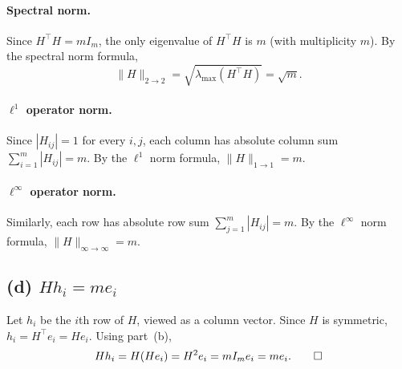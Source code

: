 \paragraph{Spectral norm.}
Since $H^\top H=mI_m$, the only eigenvalue of $H^\top H$ is $m$ (with multiplicity $m$). By the spectral norm formula,
\[
\|H\|_{2\to 2} = \sqrt{\lambda_{\max}(H^\top H)} = \sqrt{m}.
\]

\paragraph{$\ell^1$ operator norm.}
Since $|H_{ij}|=1$ for every $i,j$, each column has absolute column sum $\sum_{i=1}^m |H_{ij}| = m$. By the $\ell^1$ norm formula, $\|H\|_{1\to 1}=m$.

\paragraph{$\ell^\infty$ operator norm.}
Similarly, each row has absolute row sum $\sum_{j=1}^m |H_{ij}| = m$. By the $\ell^\infty$ norm formula, $\|H\|_{\infty\to \infty}=m$.

\subsection*{(d) $Hh_i=me_i$}

Let $h_i$ be the $i$th row of $H$, viewed as a column vector. Since $H$ is symmetric, $h_i = H^\top e_i = He_i$. Using part~(b),
\[
Hh_i = H(He_i) = H^2e_i = mI_me_i = me_i. \qedhere
\]
